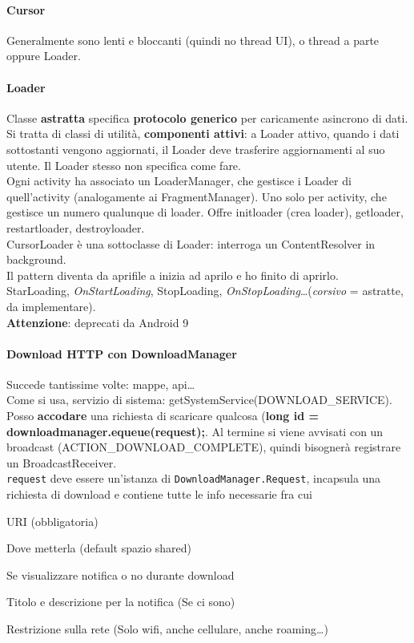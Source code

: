 \documentclass[10pt]{book}
\begin{document}
\paragraph{Cursor} Generalmente sono lenti e bloccanti (quindi no thread UI), o thread a parte oppure Loader.
\paragraph{Loader} Classe \textbf{astratta} specifica \textbf{protocolo generico} per caricamente asincrono di dati.\\ Si tratta di classi di utilità, \textbf{componenti attivi}: a Loader attivo, quando i dati sottostanti vengono aggiornati, il Loader deve trasferire aggiornamenti al suo utente. Il Loader stesso non specifica come fare.\\
Ogni activity ha associato un LoaderManager, che gestisce i Loader di quell'activity (analogamente ai FragmentManager). Uno solo per activity, che gestisce un numero qualunque di loader. Offre initloader (crea loader), getloader, restartloader, destroyloader.\\
CursorLoader è una sottoclasse di Loader: interroga un ContentResolver in background.\\
Il pattern diventa da aprifile a inizia ad aprilo e ho finito di aprirlo.\\
StarLoading, \textit{OnStartLoading}, StopLoading, \textit{OnStopLoading}\ldots (\textit{corsivo} = astratte, da implementare).\\
\textbf{Attenzione}: deprecati da Android 9
\paragraph{Download HTTP con DownloadManager} Succede tantissime volte: mappe, api\ldots\\
Come si usa, servizio di sistema: getSystemService(DOWNLOAD\_SERVICE). Posso \textbf{accodare} una richiesta di scaricare qualcosa (\textbf{long id = downloadmanager.equeue(request);}. Al termine si viene avvisati con un broadcast (ACTION\_DOWNLOAD\_COMPLETE), quindi bisognerà registrare un BroadcastReceiver.\\
\texttt{request} deve essere un'istanza di \texttt{DownloadManager.Request}, incapsula una richiesta di download e contiene tutte le info necessarie fra cui
\begin{list}{}{}
	\item URI (obbligatoria)
	\item Dove metterla (default spazio shared)
	\item Se visualizzare notifica o no durante download
	\item Titolo e descrizione per la notifica (Se ci sono)
	\item Restrizione sulla rete (Solo wifi, anche cellulare, anche roaming\ldots)
\end{list}
\end{document}

